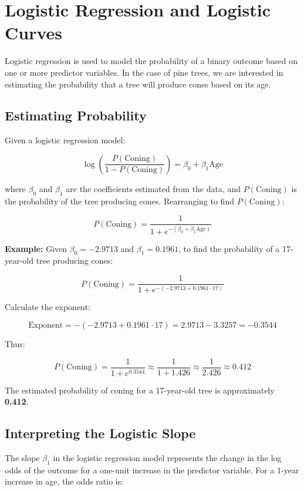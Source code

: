 \documentclass{article}
\begin{document}
\section{Logistic Regression and Logistic Curves}

Logistic regression is used to model the probability of a binary outcome based on one or more predictor variables. In the case of pine trees, we are interested in estimating the probability that a tree will produce cones based on its age.

\subsection{Estimating Probability}

Given a logistic regression model:

\[
\log \left( \frac{P(\text{Coning})}{1 - P(\text{Coning})} \right) = \beta_0 + \beta_1 \text{Age}
\]

where \( \beta_0 \) and \( \beta_1 \) are the coefficients estimated from the data, and \( P(\text{Coning}) \) is the probability of the tree producing cones. Rearranging to find \( P(\text{Coning}) \):

\[
P(\text{Coning}) = \frac{1}{1 + e^{-(\beta_0 + \beta_1 \text{Age})}}
\]

\textbf{Example:} Given \(\beta_0 = -2.9713\) and \(\beta_1 = 0.1961\), to find the probability of a 17-year-old tree producing cones:

\[
P(\text{Coning}) = \frac{1}{1 + e^{-(-2.9713 + 0.1961 \cdot 17)}}
\]

Calculate the exponent:

\[
\text{Exponent} = -(-2.9713 + 0.1961 \cdot 17) = 2.9713 - 3.3257 = -0.3544
\]

Thus:

\[
P(\text{Coning}) = \frac{1}{1 + e^{0.3544}} \approx \frac{1}{1 + 1.426} \approx \frac{1}{2.426} \approx 0.412
\]

The estimated probability of coning for a 17-year-old tree is approximately \textbf{0.412}.

\subsection{Interpreting the Logistic Slope}

The slope \( \beta_1 \) in the logistic regression model represents the change in the log odds of the outcome for a one-unit increase in the predictor variable. For a 1-year increase in age, the odds ratio is:
\end{document}
